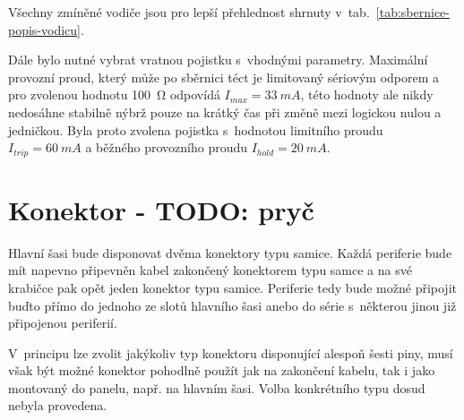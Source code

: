     Všechny zmíněné vodiče jsou pro lepší přehlednost shrnuty v~tab.~\ref{tab:sbernice-popis-vodicu}.


    Dále bylo nutné vybrat vratnou pojistku s~vhodnými parametry. Maximální provozní proud, který může po sběrnici téct je limitovaný sériovým odporem a pro zvolenou hodnotu \qty{100}{\ohm} odpovídá \(I_{max} =\qty{33}{mA}\), této hodnoty ale nikdy nedosáhne stabilně nýbrž pouze na krátký čas při změně mezi logickou nulou a jedničkou. Byla proto zvolena pojistka s~hodnotou limitního proudu \(I_{trip} =\qty{60}{mA}\) a běžného provozního proudu \(I_{hold} =\qty{20}{mA}\). 

\section{Konektor - TODO: pryč}
    Hlavní šasi bude disponovat dvěma konektory typu samice. Každá periferie bude mít napevno připevněn kabel zakončený konektorem typu samce a na své krabičce pak opět jeden konektor typu samice. Periferie tedy bude možné připojit buďto přímo do jednoho ze slotů hlavního šasi anebo do série s~některou jinou již připojenou periferií. 

    V~principu lze zvolit jakýkoliv typ konektoru disponující alespoň šesti piny, musí však být možné konektor pohodlně použít jak na zakončení kabelu, tak i jako montovaný do panelu, např. na hlavním šasi. Volba konkrétního typu dosud nebyla provedena.


            